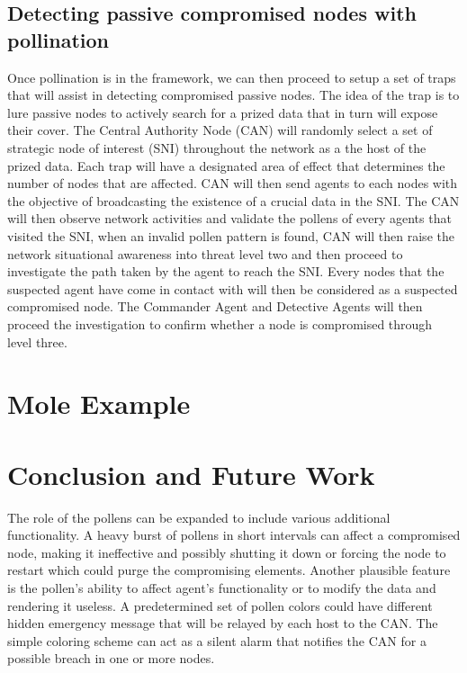\documentclass{acm_proc_article-sp}
\begin{document}
\subsection{Detecting passive compromised nodes with pollination}
Once pollination is in the framework, we can then proceed to setup a set of traps that will assist in detecting compromised passive nodes. The idea of the trap is to lure passive nodes to actively search for a  prized data that in turn will expose their cover. The Central Authority Node (CAN) will randomly select a set of strategic node of interest (SNI) throughout the network as a the host of the prized data. Each trap will have a designated area of effect that determines the number of nodes that are affected. CAN will then send agents to each nodes with the objective of broadcasting the existence of a crucial data in the SNI. The CAN will then observe network activities and validate the pollens of every agents that visited the SNI, when an invalid pollen pattern is found, CAN will then raise the network situational awareness into threat level two and then proceed to investigate the path taken by the agent to reach the SNI. Every nodes that the suspected agent have come in contact with will then be considered as a suspected compromised node. The Commander Agent and Detective Agents will then proceed the investigation to confirm whether a node is compromised through level three. 

\section{Mole Example}

\section{Conclusion and Future Work}
The role of the pollens can be expanded to include various additional functionality. A heavy burst of pollens in short intervals can affect a compromised node, making it ineffective and possibly shutting it down or forcing the node to restart which could purge the compromising elements. Another plausible feature is the pollen's ability to affect agent's functionality or to modify the data and rendering it useless. A predetermined set of pollen colors could have different hidden emergency message that will be relayed by each host to the CAN. The simple coloring scheme can act as a silent alarm that notifies the CAN for a possible breach in one or more nodes.
\end{document}
